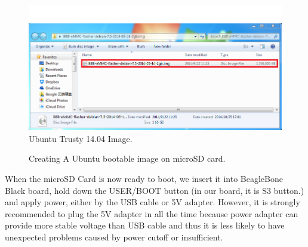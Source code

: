 \documentclass[12pt,journal,draftclsnofoot,onecolumn]{IEEEtran}
\begin{document}
\begin{figure}[htb]
	\centering
	\includegraphics[width=5in]{./figs/osimage.PNG}
	\caption{Ubuntu Trusty 14.04 Image.}
	\label{osimage}
\end{figure}

\begin{figure}[htb]
	\centering
     \caption{Creating A Ubuntu bootable image on microSD card.}
     \end{figure}
     
When the microSD Card is now ready to boot, we insert it into BeagleBone Black board, hold down the USER/BOOT button (in our board, it is S3 button.) and apply power, either by the USB cable or 5V adapter. However, it is strongly recommended to plug the 5V adapter in all the time because power adapter can provide more stable voltage than USB cable and thus it is less likely to have unexpected problems caused by power cutoff or insufficient. 
\end{document}
